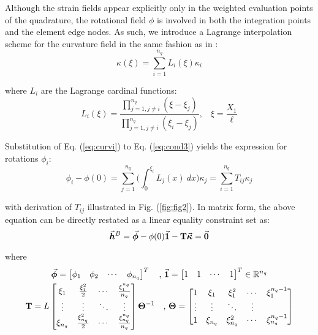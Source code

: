 Although the strain fields appear explicitly
only in the weighted evaluation points of the quadrature, the rotational field
$\phi$ is involved in both the integration points and the element edge nodes.
As such, we introduce a Lagrange interpolation scheme for the curvature
field in the same fashion as in \cite{Andriotis}:
\begin{equation}
	\kappa(\xi) = \sum_{i=1}^{n_q}L_i(\xi)\kappa_i
	\label{eq:curvi}
\end{equation}

\noindent where $L_i$ are the Lagrange cardinal functions:
\begin{equation}
	L_i(\xi) = \frac{\displaystyle\prod_{j=1,j\neq i}^{n_q}
		(\xi-\xi_j)}{\displaystyle\prod_{j=1,j\neq i}^{n_q} 
		(\xi_i-\xi_j)}\text{,}\quad
	\xi=\frac{X_1}{\ell}\nonumber
\end{equation}

\noindent Substitution of Eq. (\ref{eq:curvi}) to Eq. (\ref{eq:cond3}) yields
the expression for rotations $\phi_i$:
\begin{equation}
	\phi_i-\phi(0) = \sum_{j=1}^{n_q}\bigg(\int_0^{\xi_i}L_j(x)\ 
	dx\bigg)\kappa_j =
	\sum_{i=1}^{n_q} T_{ij}\kappa_j
\end{equation}
\begin{figure*}[b]
	\centering
	\qquad
	\caption{Integration of curvature shape functions.}%
	\label{fig:fig2}%
\end{figure*}
\noindent with derivation of $T_{ij}$ illustrated in Fig.  (\ref{fig:fig2}).
In matrix form, the above equation can be directly restated as a linear
equality constraint set as:
\begin{equation}
	\vec{\bm{h}}^B=\vec{\bm{\phi}} - \phi(0)\vec{\bm{1}} - \mathbf{T}\vec{\bm{\kappa}} = \vec{\bm{0}}
	\label{eq:hb}
\end{equation}

\noindent where
\begin{gather}
	\vec{\bm{\phi}}=
	\begin{bmatrix}
		\phi_1 & \phi_2 & \cdots & \phi_{n_q}
	\end{bmatrix}^T\quad \text{,}\ \vec{\bm{1}}= \begin{bmatrix}
		1 & 1 & \cdots & 1
	\end{bmatrix}^T\in\mathbb{R}^{n_q} \nonumber\\
	\mathbf{T} = L\begin{bmatrix}
		\xi_1 & \frac{\xi_1^2}{2} & \cdots & 
		\frac{\xi_1^{n_q}}{n_q}\\
		\vdots & \vdots & \ddots & \vdots\\
		\xi_{n_q} & \frac{\xi_{n_q}^2}{2} & \cdots & 
		\frac{\xi_{n_q}^{n_q}}{n_q}
	\end{bmatrix}\mathbf{\Theta}^{-1}\quad \text{,}\ \mathbf{\Theta} = 
	\begin{bmatrix}
		1 & \xi_1 & \xi_1^2 & \cdots & \xi_1^{n_q-1}\\
		\vdots &\vdots & \ddots & \vdots\\
		1 & \xi_{n_q} & \xi_{n_q}^2 & \cdots &\xi_{n_q}^{n_q-1}
	\end{bmatrix}\nonumber
\end{gather}

